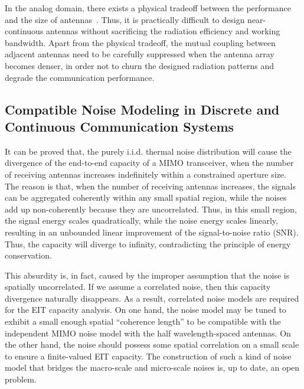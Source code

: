 \documentclass[journal,twocolumn]{IEEEtran}
\begin{document}
In the analog domain, there exists a physical tradeoff between the performance and the size of antennas~\cite{stratton2007electromagnetic}. Thus, it is practically difficult to design near-continuous antennas without sacrificing the radiation efficiency and working bandwidth. Apart from the physical tradeoff, the mutual coupling between adjacent antennas need to be carefully suppressed when the antenna array becomes denser, in order not to churn the designed radiation patterns and degrade the communication performance. 


\subsection{Compatible Noise Modeling in Discrete and Continuous Communication Systems}
It can be proved that, the purely i.i.d. thermal noise distribution will cause the divergence of the end-to-end capacity of a MIMO transceiver, when the number of receiving antennas increases indefinitely within a constrained aperture size. 
The reason is that, when the number of receiving antennas increases, the signals can be aggregated coherently within any small spatial region, while the noises add up non-coherently because they are uncorrelated. 
Thus, in this small region, the signal energy scales quadratically, while the noise energy scales linearly, resulting in an unbounded linear improvement of the signal-to-noise ratio (SNR). Thus, the capacity will diverge to infinity, contradicting the principle of energy conservation.  

This absurdity is, in fact, caused by the improper assumption that the noise is spatially uncorrelated. 
If we assume a correlated noise, then this capacity divergence naturally disappears. 
As a result, correlated noise models are required for the EIT capacity analysis. On one hand, the noise model may be tuned to exhibit a small enough spatial ``coherence length'' to be compatible with the independent MIMO noise model with the half wavelength-spaced antennas. On the other hand, the noise should possess some spatial correlation on a small scale to ensure a finite-valued EIT capacity. 
The construction of such a kind of noise model that bridges the macro-scale and micro-scale noises is, up to date, an open problem. 

\end{document}

